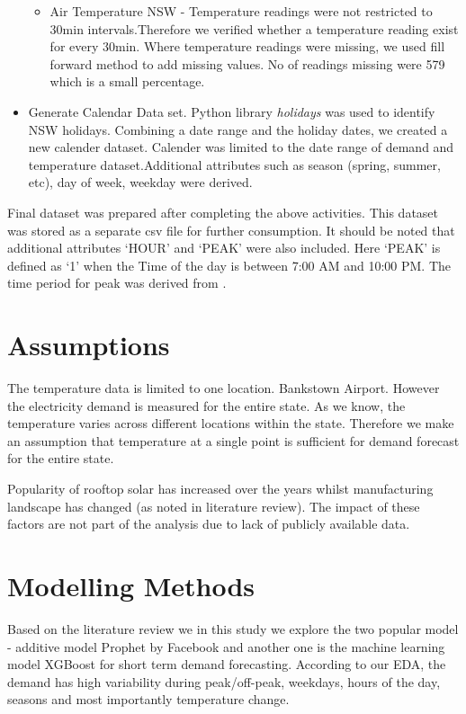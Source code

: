 \documentclass[mstat,12pt]{unswthesis}
\begin{document}
\begin{itemize}
\begin{itemize}
      \item Air Temperature NSW - Temperature readings were not restricted to 30min intervals.Therefore we verified whether a temperature reading exist for every 30min. Where temperature readings were missing, we used fill forward method to add missing values. No of readings missing were 579 which is a small percentage.
    \end{itemize}
  \item Generate Calendar Data set. Python library \textit{holidays} was used to identify NSW holidays. Combining a date range and the holiday dates, we created a new calender dataset. Calender was limited to the date range of demand and temperature dataset.Additional attributes such as season (spring, summer, etc), day of week, weekday were derived.
\end{itemize}

Final dataset was prepared after completing the above activities. This
dataset was stored as a separate csv file for further consumption. It
should be noted that additional attributes `HOUR' and `PEAK' were also
included. Here `PEAK' is defined as `1' when the Time of the day is
between 7:00 AM and 10:00 PM. The time period for peak was derived from
\cite{canstarblue_peakoffpeak}.

\section{Assumptions}\label{assumptions}

The temperature data is limited to one location. Bankstown Airport.
However the electricity demand is measured for the entire state. As we
know, the temperature varies across different locations within the
state. Therefore we make an assumption that temperature at a single
point is sufficient for demand forecast for the entire state.

Popularity of rooftop solar has increased over the years whilst
manufacturing landscape has changed (as noted in literature review). The
impact of these factors are not part of the analysis due to lack of
publicly available data.

\section{Modelling Methods}\label{modelling-methods}

Based on the literature review we in this study we explore the two
popular model - additive model Prophet by Facebook and another one is
the machine learning model XGBoost for short term demand forecasting.
According to our EDA, the demand has high variability during
peak/off-peak, weekdays, hours of the day, seasons and most importantly
temperature change.
\end{document}
